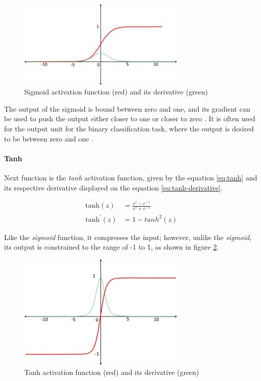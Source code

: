 \begin{figure}[H]
\begin{centering}
\includegraphics[width=8cm]{assets/images/sigmoid.jpg}
\par\end{centering}
\caption{Sigmoid activation function (red) and its derivative (green) \cite{Santosh2022-2}}
\label{fig:sigmoid}
\end{figure}

The output of the sigmoid is bound between zero and one, and its gradient can be used to push the output either closer to one or closer to zero \cite{Santosh2022-2}. It is often used for the output unit for the binary classification task, where the output is desired to be between zero and one \cite{Santosh2022-2, Goodfellow2016}.

\paragraph{Tanh} Next function is the \textit{tanh} activation function, given by the equation \ref{eq:tanh} and its respective derivative displayed on the equation \ref{eq:tanh-derivative}.

\begin{align}
\label{eq:tanh}
    \text{tanh}(z) &= \frac{e^z-e^{-z}}{e^z+e^{-z}} \\
\label{eq:tanh-derivative}
    \text{tanh}^{'}(z) &= 1-tanh^2(z)
\end{align}

Like the \textit{sigmoid} function, it compresses the input; however, unlike the \textit{sigmoid}, its output is constrained to the range of -1 to 1, as shown in figure \ref{fig:tanh}.

\begin{figure}[H]
\begin{centering}
\includegraphics[width=8cm]{assets/images/tanh.jpg}
\par\end{centering}
\caption{Tanh activation function (red) and its derivative (green) \cite{Santosh2022-2}}
\label{fig:tanh}
\end{figure}

